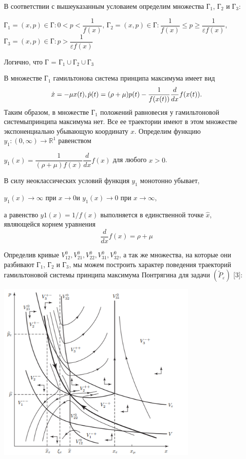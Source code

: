 В соответствии с вышеуказанным условаием определим множества Г$_1$, Г$_2$ и Г$_3$:
\begin{center}
Г$_1 = {(x,p)\in} $Г$: 0 < p < \dfrac{1}{f(x)} $, Г$_2 = {(x,p)\in} $Г$: \dfrac{1}{f(x)} \le p \ge \dfrac{1}{\varepsilon f(x)} $,\\
Г$_3 = {(x,p)\in} $Г$: p > \dfrac{1}{\varepsilon f(x)} $
\end{center}

Логично, что Г = Г$_1 \cup $Г$_2 \cup $Г$_3$

В множестве Г$_1$ гамильтонова система принципа максимума имеет вид
\begin{equation}
\dot{x} = -\mu x(t),\\
\dot{p}(t)=(\rho + \mu)p(t) - \dfrac{1}{f(x(t))} \dfrac{d}{dx}f(x(t)).
\end{equation}
Таким образом, в множестве Г$_1$ положений равновесия у гамильтоновой системыпринципа
максимума нет. Все ее траектории имеют в этом множестве экспоненциально убывающую
координату $ x $.
Определим функцию $ y_1 : (0,\infty) \rightarrow \mathbb{R}^1  $ равенством
\begin{center}
$ y_1(x)=\dfrac{1}{(\rho + \mu)f(x)} \dfrac{d}{dx}f(x) $  для любого  $ x > 0 $.
\end{center}
В силу неоклассических условий функция $ y_1 $ монотонно убывает,
\begin{center}
$ y_1(x) \rightarrow \infty $ при $ x \rightarrow 0  $и $ y_1(x) \rightarrow 0 $ при $ x \rightarrow \infty $,
\end{center}
а равенство $ y1(x)=1/f(x) $ выполняется в единственной точке $ \hat{x} $, являющейся корнем уравнения
\begin{equation}
\dfrac{d}{dx}f(x) = \rho + \mu
\end{equation}

Определив кривые $ V^0_{12}, V^0_{21}, V^0_{22}, V^0_{31}, V^0_{32} $, а так же множества, на которые они разбивают Г$_1$, Г$_2$ и Г$_3$, мы можем построить характер поведения траекторий гамильтоновой системы принципа максимума Понтрягина для задачи  $ (\tilde{P}_\varepsilon) $ [3]:
\begin{center}
	\includegraphics[width=10cm]{dugi}
\end{center}

